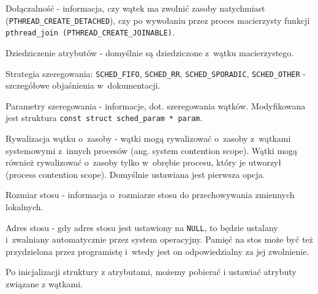 \begin{myitemize}
\item Dołączalność - informacja, czy wątek ma zwolnić zasoby natychmiast (\lstinline[style=MyCStyle]{PTHREAD_CREATE_DETACHED}), czy po wywołaniu przez proces macierzysty funkcji \lstinline[style=MyCStyle]{pthread_join (PTHREAD_CREATE_JOINABLE)}.
\item Dziedziczenie atrybutów - domyślnie są dziedziczone z~wątku macierzystego.
\item Strategia szeregowania: \lstinline[style=MyCStyle]{SCHED_FIFO}, \lstinline[style=MyCStyle]{SCHED_RR}, \lstinline[style=MyCStyle]{SCHED_SPORADIC}, \lstinline[style=MyCStyle]{SCHED_OTHER} - szczegółowe objaśnienia w~dokumentacji.
\item Parametry szeregowania - informacje, dot. szeregowania wątków. Modyfikowana jest struktura \lstinline[style=MyCStyle]{const struct sched_param * param}.
\item Rywalizacja wątku o~zasoby - wątki mogą rywalizować o~zasoby z~wątkami systemowymi z~innych procesów (ang. system contention scope).  Wątki mogą również rywalizować o~zasoby tylko w~obrębie procesu, który je utworzył (process contention scope). Domyślnie ustawiana jest pierwsza opcja.
\item Rozmiar stosu - informacja o~rozmiarze stosu do przechowywania zmiennych lokalnych.
\item Adres stosu - gdy adres stosu jest ustawiony na \lstinline[style=MyCStyle]{NULL}, to będzie ustalany i~zwalniany automatycznie przez system operacyjny. Pamięć na stos może być też przydzielona przez programistę i~wtedy jest on odpowiedzialny za jej zwolnienie.
\end{myitemize}

Po inicjalizacji struktury z atrybutami, możemy pobierać i ustawiać atrybuty związane z wątkami.

